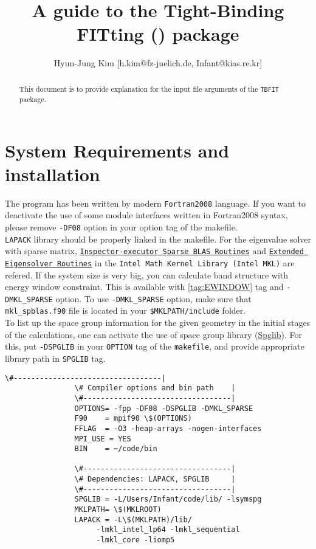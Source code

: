 \documentclass[a4paper,12pt]{scrartcl}
\title{A guide to the Tight-Binding FITting (\tbfitname{}) package}
\author{Hyun-Jung Kim [h.kim@fz-juelich.de, Infant@kias.re.kr]}
\newcommand{\tbfitname}{\textcolor{blue!85!white}{\texttt{TBFIT}}}
\newcommand{\textblue}[1]{\textcolor{blue!85!white}{\texttt{#1}}}
\begin{document}
\maketitle

\begin{abstract}
This document is to provide explanation for the input file arguments of the \tbfitname{} package.

\end{abstract}
\section*{\label{sec:INSTALL}{System Requirements and installation}}

The program has been written by modern \texttt{Fortran2008} language. If you want to deactivate the use of some module interfaces written in Fortran2008 syntax, please remove \texttt{-DF08} option in your option tag of the makefile. \\

\texttt{LAPACK} library should be properly linked in the makefile. For the eigenvalue solver with sparse matrix, \href{https://software.intel.com/en-us/mkl-developer-reference-fortran-inspector-executor-sparse-blas-routines}{\texttt{Inspector-executor Sparse BLAS Routines}} and \href{https://software.intel.com/en-us/mkl-developer-reference-fortran-extended-eigensolver-routines}{\texttt{Extended Eigensolver Routines}} in the \texttt{Intel Math Kernel Library (Intel MKL)} are refered. If the system size is very big, you can calculate band structure with energy window constraint. This is available with \ref{tag:EWINDOW} tag and \textblue{-DMKL\_SPARSE} option. To use \textblue{-DMKL\_SPARSE} option, make sure that \texttt{mkl\_spblas.f90} file is located in your \texttt{\$MKLPATH/include} folder. \\

To list up the space group information for the given geometry in the initial stages of the calculations, one can activate the use of space group library (\href{https://atztogo.github.io/spglib/#}{Spglib}). For this, put \textblue{\label{tag:SPGLIBO}{-DSPGLIB}} in your \texttt{OPTION} tag of the \texttt{makefile}, and provide appropriate library path in \textblue{SPGLIB} tag.

		\begin{Verbatim}[commandchars=\\\{\},gobble=4, frame=single, framesep=2mm, 
		   	label= \texttt{makefile} example ,
		   	labelposition=bottomline]
				\#----------------------------------|
				\# Compiler options and bin path    |
				\#----------------------------------|
				OPTIONS= -fpp -DF08 -DSPGLIB -DMKL_SPARSE
				F90    = mpif90 \$(OPTIONS)
				FFLAG  = -O3 -heap-arrays -nogen-interfaces
				MPI_USE = YES
				BIN    = ~/code/bin

				\#----------------------------------|
				\# Dependencies: LAPACK, SPGLIB     |
				\#----------------------------------|
				SPGLIB = -L/Users/Infant/code/lib/ -lsymspg
				MKLPATH= \$(MKLROOT)
				LAPACK = -L\$(MKLPATH)/lib/
					 -lmkl_intel_lp64 -lmkl_sequential
					 -lmkl_core -liomp5
		\end{Verbatim}
\end{document}
